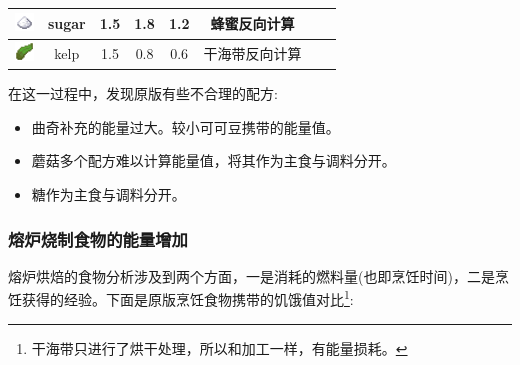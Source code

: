 \begin{center}
\begin{longtable}{c|c|ccc|ccc}
        \includegraphics[width=0.5cm,height=0.5cm]{./images/origin/sugar.png} & sugar & 1.5 & 1.8 & 1.2 & 蜂蜜反向计算 \\
        \midrule
        \includegraphics[width=0.5cm,height=0.5cm]{./images/origin/kelp.png} & kelp & 1.5 & 0.8 & 0.6 & 干海带反向计算 \\
        \bottomrule
    \end{longtable}
\end{center}

在这一过程中，发现原版有些不合理的配方:
\begin{itemize}
    \item 曲奇补充的能量过大。较小可可豆携带的能量值。
    \item 蘑菇多个配方难以计算能量值，将其作为主食与调料分开。
    \item 糖作为主食与调料分开。
\end{itemize}

\subsubsection{熔炉烧制食物的能量增加}

熔炉烘焙的食物分析涉及到两个方面，一是消耗的燃料量(也即烹饪时间)，二是烹饪获得的经验。下面是原版烹饪食物携带的饥饿值对比\footnote{干海带只进行了烘干处理，所以和加工一样，有能量损耗。}:

